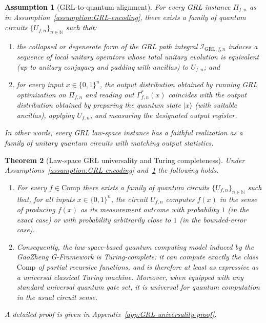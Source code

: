 \documentclass[11pt]{book}
\theoremstyle{plain}
\newtheorem{theorem}{Theorem}[chapter]
\newtheorem{assumption}[theorem]{Assumption}
\theoremstyle{definition}
\theoremstyle{remark}
\begin{document}
\hypertarget{anchor:GRL-QC-alignment}{}
\begin{assumption}[GRL-to-quantum alignment]\label{assumption:GRL-QC-alignment}
For every GRL instance $\Pi_{f,n}$ as in
Assumption~\ref{assumption:GRL-encoding}, there exists a family of quantum
circuits $\{U_{f,n}\}_{n\in\mathbb{N}}$ such that:
\begin{enumerate}[label=(\roman*)]
  \item the collapsed or degenerate form of the GRL path integral
        $\mathcal{I}_{\mathrm{GRL},f,n}$ induces a sequence of local unitary
        operators whose total unitary evolution is equivalent (up to
        unitary conjugacy and padding with ancillas) to $U_{f,n}$; and
  \item for every input $x\in\{0,1\}^n$, the output distribution obtained
        by running GRL optimization on $\Pi_{f,n}$ and reading out
        $\Gamma_{f,n}^\ast(x)$ coincides with the output distribution
        obtained by preparing the quantum state $|x\rangle$ (with suitable
        ancillas), applying $U_{f,n}$, and measuring the designated output
        register.
\end{enumerate}
In other words, every GRL law-space instance has a faithful realization as
a family of unitary quantum circuits with matching output statistics.
\end{assumption}

\begin{theorem}[Law-space GRL universality and Turing completeness]\label{thm:GRL-universality}
Under Assumptions~\ref{assumption:GRL-encoding}
and~\ref{assumption:GRL-QC-alignment} the following holds.
\begin{enumerate}[label=(\roman*)]
  \item For every $f\in\mathrm{Comp}$ there exists a family of quantum
        circuits $\{U_{f,n}\}_{n\in\mathbb{N}}$ such that, for all inputs
        $x\in\{0,1\}^n$, the circuit $U_{f,n}$ computes $f(x)$ in the sense
        of producing $f(x)$ as its measurement outcome with probability
        $1$ (in the exact case) or with probability arbitrarily close to
        $1$ (in the bounded-error case).
  \item Consequently, the law-space-based quantum computing model induced
        by the GaoZheng G-Framework is Turing-complete: it can compute
        exactly the class $\mathrm{Comp}$ of partial recursive functions,
        and is therefore at least as expressive as a universal classical
        Turing machine. Moreover, when equipped with any standard
        universal quantum gate set, it is universal for quantum
        computation in the usual circuit sense.
\end{enumerate}
A detailed proof is given in Appendix~\ref{app:GRL-universality-proof}.
\end{theorem}
\end{document}
